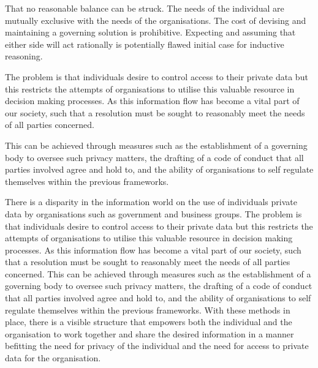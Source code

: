 
That no reasonable balance can be struck. The needs of the individual are mutually exclusive with the needs of the organisations. The cost of devising and maintaining a governing solution is prohibitive. Expecting and assuming that either side will act rationally is potentially flawed initial case for inductive reasoning.





The problem is that individuals desire to control access to their private data but this restricts the attempts of organisations to utilise this valuable resource in decision making processes. As this information flow has become a vital part of our society, such that a resolution must be sought to reasonably meet the needs of all parties concerned.


This can be achieved through measures such as the establishment of a governing body to oversee such privacy matters, the drafting of a code of conduct that all parties involved agree and hold to, and the ability of organisations to self regulate themselves within the previous frameworks.


There is a disparity in the information world on the use of individuals private data by organisations such as government and business groups. The problem is that individuals desire to control access to their private data but this restricts the attempts of organisations to utilise this valuable resource in decision making processes. As this information flow has become a vital part of our society, such that a resolution must be sought to reasonably meet the needs of all parties concerned. This can be achieved through measures such as the establishment of a governing body to oversee such privacy matters, the drafting of a code of conduct that all parties involved agree and hold to, and the ability of organisations to self regulate themselves within the previous frameworks.  With these methods in place, there is a visible structure that empowers both the individual and the organisation to work together and share the desired information in a manner befitting the need for privacy of the individual and the need for access to private data for the organisation.

